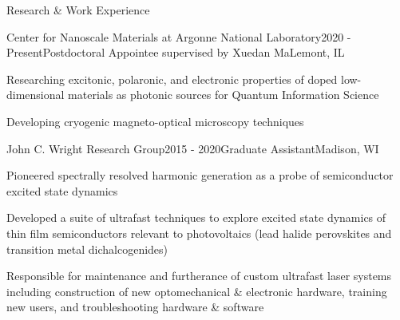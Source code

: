 \documentclass{resume} %
\begin{document}
\begin{rSection}{Research \& Work Experience}

\begin{rSubsection}{Center for Nanoscale Materials at Argonne National Laboratory}{2020 - Present}{Postdoctoral Appointee supervised by Xuedan Ma}{Lemont, IL}
	\item Researching excitonic, polaronic, and electronic properties of doped low-dimensional materials as photonic sources for Quantum Information Science
	\item Developing cryogenic magneto-optical microscopy techniques 	
\end{rSubsection}

\begin{rSubsection}{John C. Wright Research Group}{2015 - 2020}{Graduate Assistant}{Madison, WI}
	\item Pioneered spectrally resolved harmonic generation as a probe of semiconductor excited state dynamics
	\item Developed a suite of ultrafast techniques to explore excited state dynamics of thin film semiconductors relevant to photovoltaics (lead halide perovskites and transition metal dichalcogenides)%
	\item Responsible for maintenance and furtherance of custom ultrafast laser systems including construction of new optomechanical \& electronic hardware, training new users, and troubleshooting hardware \& software
\end{rSubsection}




\end{rSection}
\end{document}
